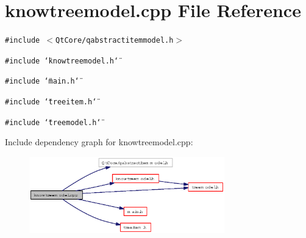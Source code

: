 \section{knowtreemodel.cpp File Reference}
\label{knowtreemodel_8cpp}
{\tt \#include $<$Qt\-Core/qabstractitemmodel.h$>$}\par
{\tt \#include \char`\"{}knowtreemodel.h\char`\"{}}\par
{\tt \#include \char`\"{}main.h\char`\"{}}\par
{\tt \#include \char`\"{}treeitem.h\char`\"{}}\par
{\tt \#include \char`\"{}treemodel.h\char`\"{}}\par


Include dependency graph for knowtreemodel.cpp:\begin{figure}[H]
\begin{center}
\leavevmode
\includegraphics[width=240pt]{knowtreemodel_8cpp__incl}
\end{center}
\end{figure}
